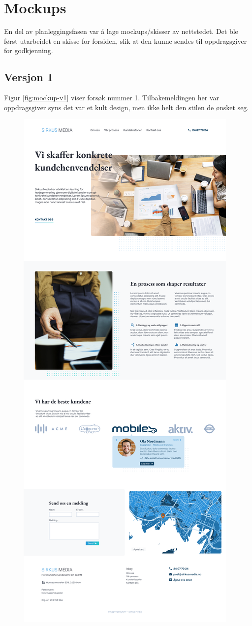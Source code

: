 \section{Mockups}
En del av planleggingsfasen var å lage mockups/skisser av nettstedet. Det ble først utarbeidet en skisse for forsiden, slik at den kunne sendes til oppdragsgiver for godkjenning.

\subsection{Versjon 1}
Figur \ref{fig:mockup-v1} viser forsøk nummer 1. Tilbakemeldingen her var oppdragsgiver syns det var et kult design, men ikke helt den stilen de ønsket seg.
\begin{figure}[H]
    \centering
    \includegraphics[height=\textheight]{design/mockup1-draft3.png}

\end{figure}
